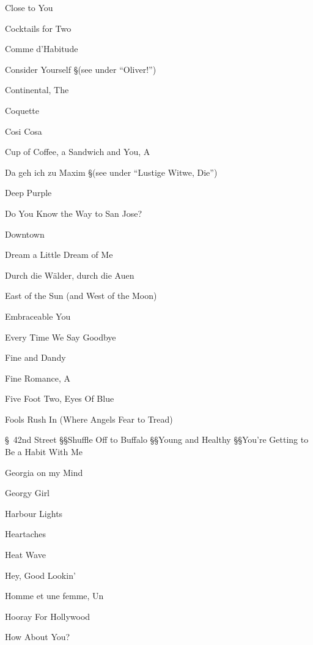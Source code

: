 \N Close to You

\N Cocktails for Two

\N Comme d'Habitude

\N Consider Yourself
\nobreak
\S (see under ``Oliver!'')

\N Continental, The

\N Coquette

\N Cosi Cosa

\N Cup of Coffee, a Sandwich and You, A

\N Da geh ich zu Maxim
\nobreak
\S (see under ``Lustige Witwe, Die'')

\N Deep Purple

\N Do You Know the Way to San Jose?

\N Downtown

\N Dream a Little Dream of Me

\N Durch die W{\"a}lder, durch die Auen

\N East of the Sun (and West of the Moon)

\N Embraceable You

\N Every Time We Say Goodbye

\N Fine and Dandy

\N Fine Romance, A

\N Five Foot Two, Eyes Of Blue

\N Fools Rush In (Where Angels Fear to Tread)

\S\ 42nd Street
\S\S Shuffle Off to Buffalo
\S\S Young and Healthy
\S\S You're Getting to Be a Habit With Me

\N Georgia on my Mind

\N Georgy  Girl

\N Harbour Lights

\N Heartaches

\N Heat Wave

\N Hey, Good Lookin'

\N Homme et une femme, Un

\N Hooray For Hollywood

\N How About You?

\singlecolumn


\bye
